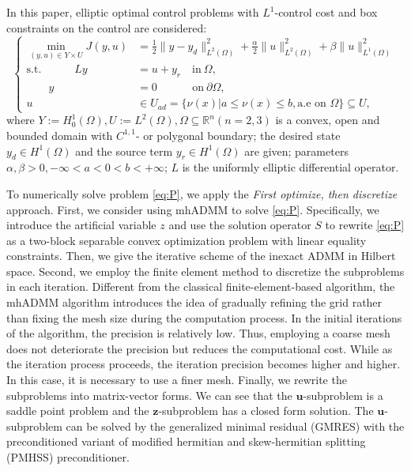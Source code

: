 \documentclass[12pt]{llncs}
\begin{document}
 In this paper, elliptic optimal control problems with $L^1$-control cost and box constraints
 on the control are considered:
\begin{equation}
	\left.\left\{\begin{aligned}\min_{(y,u)\in Y\times
			U}J(y,u)&=\frac{1}{2}\|y-y_d\|_{L^2(\Omega)}^2+\frac{\alpha}{2}\|u\|_{L^2(\Omega)}^2+\beta\|u\|_{L^1(\Omega)}^2\\
		\mathrm{s.t.}\qquad\quad Ly&=u+y_r\quad\mathrm{in~}\Omega,\\ \qquad y&=0\hspace{38pt}\mathrm{on~}\partial\Omega,\\u&\in U_{ad}=\{\nu(x)|a\leq\nu(x)\leq b,\text{a.e on }\Omega\}\subseteq U,\end{aligned}\right.\right.\tag{P}\label{eq:P}
\end{equation}
where $Y:=H_{0}^{1}(\Omega),U:=L^{2}(\Omega),\Omega\subseteq\mathbb{R}^{n}(n=2,3)$ is a convex, open and bounded domain with $C^{1,1}$- or polygonal boundary; the desired state $y_{d}\in H^{1}(\Omega)$ and the source term $y_{r}\in H^{1}(\Omega)$ are given; parameters $\alpha,\beta>0,-\infty<a<0<b<+\infty$; $L$ is the uniformly elliptic differential operator.
 \iffalse
 given by
$$Ly:=-\sum_{i,j=1}^n\partial_{x_j}(a_{ij}y_{x_i})+c_0y,$$
 where $a_{ij},c_0\in L^\infty(\Omega),c_0\geqslant0,a_{ij}=a_{ji}$ and there is a constant $\theta>0$, 
 such that $$\sum_{i,j=1}^na_{ij}(x)\xi_i\xi_j\geqslant\theta\|\xi\|^2,\mathrm{~a.a.~}x\in\Omega,\forall\xi\in\mathbb{R}^n.$$
 \fi
 
 To numerically solve problem \eqref{eq:P}, we apply the \textit{First optimize, then discretize} approach. 
First, we consider using mhADMM  \cite{mhADMM} to solve \eqref{eq:P}. Specifically, we introduce the artificial variable $z$ and use the solution operator $S$ to rewrite \eqref{eq:P} as a two-block separable convex optimization problem with linear
 equality constraints. Then, we give the iterative scheme of the inexact ADMM in Hilbert space. Second, we employ the finite element method to discretize the subproblems in each iteration. Different from the classical finite-element-based algorithm, the mhADMM algorithm introduces the idea of gradually refining the grid rather than fixing the mesh size during the computation process. In the initial iterations of the algorithm, the precision is relatively low. Thus, employing a coarse mesh does not deteriorate the precision but reduces the computational cost. While as the iteration process proceeds, the iteration precision becomes higher and higher. In this case, it is necessary to use a finer mesh. 
 Finally, we rewrite the subproblems into matrix-vector forms. 
We can see that the $\mathbf{u}$-subproblem is a saddle point problem and the $\mathbf{z}$-subproblem has a closed form solution. The $\mathbf{u}$-subproblem can be solved by the generalized minimal residual (GMRES) with the preconditioned variant of modified hermitian and skew-hermitian splitting (PMHSS) preconditioner.
 
\end{document}
